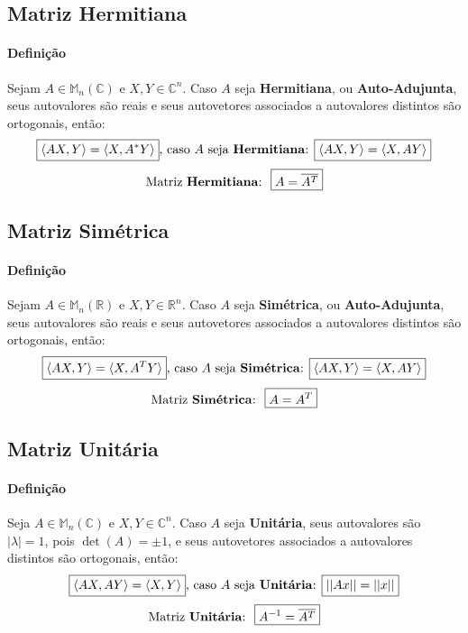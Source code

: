 \documentclass{article}
\begin{document}
        \subsection{Matriz Hermitiana}
            \paragraph{Definição}Sejam $A\in\mathbb{M}_{n}(\mathbb{C})$ e $X, Y \in\mathbb{C}^{n}$. Caso $A$ seja \textbf{Hermitiana}, ou \textbf{Auto-Adujunta}, seus autovalores são reais e seus autovetores associados a autovalores distintos são ortogonais, então:
                \[
                    \boxed{\langle AX, Y \rangle = \langle X, A^{*}Y \rangle} \text{, caso $A$ seja \textbf{Hermitiana}: } 
                    \boxed{\langle AX, Y \rangle = \langle X, AY \rangle}
                \]
                \[\text{Matriz \textbf{Hermitiana}:} \hspace{2.5mm} \boxed{A = \overline{A^{T}}}\]

        \subsection{Matriz Simétrica}
            \paragraph{Definição}Sejam $A\in\mathbb{M}_{n}(\mathbb{R})$ e $X, Y \in\mathbb{R}^{n}$. Caso $A$ seja \textbf{Simétrica}, ou \textbf{Auto-Adujunta}, seus autovalores são reais e seus autovetores associados a autovalores distintos são ortogonais, então:
                \[
                    \boxed{\langle AX, Y \rangle = \langle X, A^{T}Y \rangle} \text{, caso $A$ seja \textbf{Simétrica}: }
                    \boxed{\langle AX, Y \rangle = \langle X, AY \rangle}
                \]
                \[\text{Matriz \textbf{Simétrica}:} \hspace{2.5mm} \boxed{A = A^{T}}\]

        \subsection{Matriz Unitária}
            \paragraph{Definição}Seja $A\in\mathbb{M}_{n}(\mathbb{C})$ e $X, Y \in\mathbb{C}^{n}$. Caso $A$ seja \textbf{Unitária}, seus autovalores são $|\lambda| = 1$, pois $\det(A) = \pm 1$, e seus autovetores associados a autovalores distintos são ortogonais, então:
                \[
                    \boxed{\langle AX, AY \rangle = \langle X, Y \rangle} \text{, caso $A$ seja \textbf{Unitária}: }
                    \boxed{||Ax|| = ||x||}
                \]
                \[\text{Matriz \textbf{Unitária}:} \hspace{2.5mm} \boxed{A^{-1} = \overline{A^{T}}}\]
\end{document}

